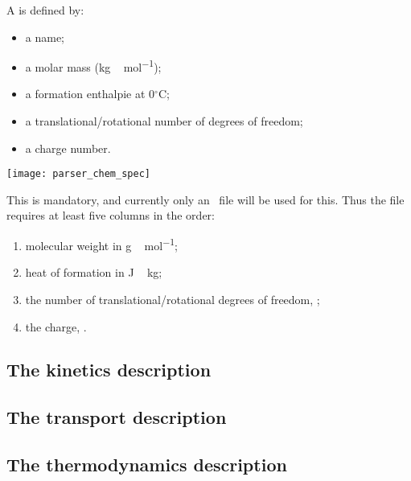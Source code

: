 A  is defined by:\\
\begin{minipage}{0.48\linewidth}
\begin{itemize}
\item a name;
\item a molar mass (\unit{kg\,mol^{-1}});
\item a formation enthalpie at 0$^\circ$\unit{C};
\item a translational/rotational number of degrees of freedom;
\item a charge number.
\end{itemize}
\end{minipage}
\hfill
\begin{minipage}{0.48\linewidth}
\centering
\texttt{[image: parser\_chem\_spec]}
\end{minipage}
\smallskip

This is mandatory, and currently only an \ascii\ file
will be used for this. Thus the file requires at least
five columns in the order:
\begin{enumerate}
\item molecular weight in \unit{g\,mol^{-1}};
\item heat of formation in \unit{J\,kg};
\item the number of translational/rotational degrees of freedom, \nounit;
\item the charge, \nounit.
\end{enumerate}

\subsection{The kinetics description}

\subsection{The transport description}

\subsection{The thermodynamics description}
